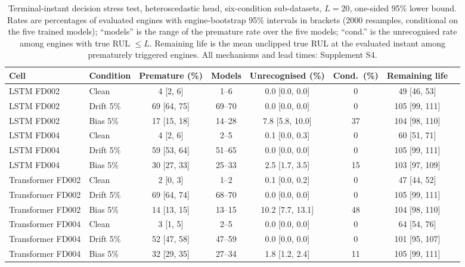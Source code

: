 \documentclass[11pt,a4paper]{article}
\begin{document}
\begin{table}[!t]
\caption{Terminal-instant decision stress test, heteroscedastic head, six-condition sub-datasets, $L=20$, one-sided 95\% lower bound. Rates are percentages of evaluated engines with engine-bootstrap 95\% intervals in brackets (2000 resamples, conditional on the five trained models); ``models'' is the range of the premature rate over the five models; ``cond.'' is the unrecognised rate among engines with true RUL $\le L$. Remaining life is the mean unclipped true RUL at the evaluated instant among prematurely triggered engines. All mechanisms and lead times: Supplement S4.}
\label{tab:dec}
\centering\footnotesize
\begin{tabular}{llcccccc}
\toprule
Cell & Condition & Premature (\%) & Models & Unrecognised (\%) & Cond.\ (\%) & Remaining life \\
\midrule
LSTM FD002 & Clean & 4 [2, 6] & 1--6 & 0.0 [0.0, 0.0] & 0 & 49 [46, 53] \\
LSTM FD002 & Drift 5\% & 69 [64, 75] & 69--70 & 0.0 [0.0, 0.0] & 0 & 105 [99, 111] \\
LSTM FD002 & Bias 5\% & 17 [15, 18] & 14--28 & 7.8 [5.8, 10.0] & 37 & 104 [98, 110] \\
\midrule
LSTM FD004 & Clean & 4 [2, 6] & 2--5 & 0.1 [0.0, 0.3] & 0 & 60 [51, 71] \\
LSTM FD004 & Drift 5\% & 59 [53, 64] & 51--65 & 0.0 [0.0, 0.0] & 0 & 105 [99, 111] \\
LSTM FD004 & Bias 5\% & 30 [27, 33] & 25--33 & 2.5 [1.7, 3.5] & 15 & 103 [97, 109] \\
\midrule
Transformer FD002 & Clean & 2 [0, 3] & 1--2 & 0.1 [0.0, 0.2] & 0 & 47 [44, 52] \\
Transformer FD002 & Drift 5\% & 69 [64, 74] & 68--70 & 0.0 [0.0, 0.0] & 0 & 105 [99, 111] \\
Transformer FD002 & Bias 5\% & 14 [13, 15] & 13--15 & 10.2 [7.7, 13.1] & 48 & 104 [98, 110] \\
\midrule
Transformer FD004 & Clean & 3 [1, 5] & 2--5 & 0.0 [0.0, 0.0] & 0 & 64 [54, 76] \\
Transformer FD004 & Drift 5\% & 52 [47, 58] & 47--59 & 0.0 [0.0, 0.0] & 0 & 101 [95, 107] \\
Transformer FD004 & Bias 5\% & 32 [29, 35] & 27--34 & 1.8 [1.2, 2.4] & 11 & 105 [99, 111] \\
\bottomrule
\end{tabular}
\end{table}
\end{document}
